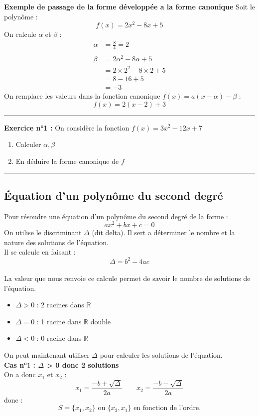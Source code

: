 \documentclass{article} %
\begin{document}
	\textbf{Exemple de passage de la forme développée a la forme canonique}
	Soit le polynôme :
	\[
		f(x) = 2x^2 - 8x + 5
	\]
	On calcule $\alpha$ et $\beta$ :
	\begin{align*}
		\alpha &= \frac{8}{4} = 2 \\\\
		\beta &= 2\alpha^2 - 8\alpha + 5 \\
		&= 2 \times 2^2 - 8 \times 2 + 5 \\
		&= 8 - 16 + 5 \\
		&= -3
	\end{align*}
	On remplace les valeurs dans la fonction canonique $f(x) = a(x - \alpha) - \beta$ : 
	\[
		f(x) = 2(x - 2) + 3
	\]
	
	\rule{\textwidth}{0.4pt}
	
	\noindent \textbf{Exercice n°1 :}
	On considère la fonction $f(x) = 3x^2 - 12x + 7$
	\begin{enumerate}
		\item Calculer $\alpha, \beta$
		\item En déduire la forme canonique de $f$
	\end{enumerate}
	
	\rule{\textwidth}{0.4pt}
	\subsection{Équation d'un polynôme du second degré}
	Pour résoudre une équation d'un polynôme du second degré de la forme :
	\[
		ax^2 + bx + c = 0
	\]
	On utilise le \b{discriminant} $\Delta$ (dit delta). Il sert a déterminer le nombre et la nature des solutions de l'équation.\\ Il se calcule en faisant :
	\[
		\Delta = b^2 - 4ac
	\]\\
	La valeur que nous renvoie ce calcule permet de savoir le nombre de solutions de l'équation.
	\begin{itemize}
		\item $\Delta > 0$ : 2 racines dans $\mathbb{R}$
		\item $\Delta = 0$ : 1 racine dans $\mathbb{R}$ double
		\item $\Delta < 0$ : 0 racine dans $\mathbb{R}$\\
	\end{itemize}
	
	\noindent On peut maintenant utiliser $\Delta$ pour calculer les solutions de l'équation.\\
	
	\textbf{Cas n°$1$ : $\Delta$ > 0 donc 2 solutions} \\
	On a donc $x_1$ et $x_2$ :
	\[
	x_1 = \frac{-b + \sqrt{\Delta}}{2a} \quad \quad x_2 = \frac{-b - \sqrt{\Delta}}{2a}
	\]
	donc :
	\[
	S = \{x_1, x_2\} \text{ ou } \{x_2, x_1\} \text{ en fonction de l'ordre.}
	\]
	
\end{document}
